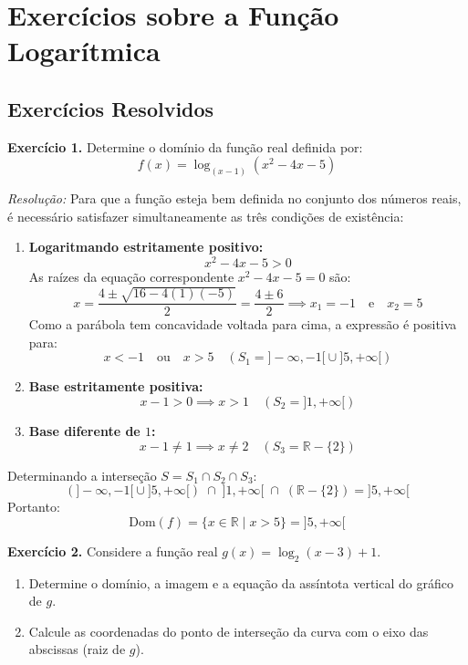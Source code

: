 \documentclass[12pt,a4paper]{report}
\begin{document}
	\section{Exercícios sobre a Função Logarítmica}
	
	\subsection*{Exercícios Resolvidos}
	
	\textbf{Exercício 1.} Determine o domínio da função real definida por:
	$$f(x) = \log_{(x - 1)} (x^2 - 4x - 5)$$
	
	\textit{Resolução:}  
	Para que a função esteja bem definida no conjunto dos números reais, é necessário satisfazer simultaneamente as três condições de existência:
	\begin{enumerate}[label=\textbf{\arabic*.}]
		\item \textbf{Logaritmando estritamente positivo:}
		$$x^2 - 4x - 5 > 0$$
		As raízes da equação correspondente $x^2 - 4x - 5 = 0$ são:
		$$x = \frac{4 \pm \sqrt{16 - 4(1)(-5)}}{2} = \frac{4 \pm 6}{2} \implies x_1 = -1 \quad \text{e} \quad x_2 = 5$$
		Como a parábola tem concavidade voltada para cima, a expressão é positiva para:
		$$x < -1 \quad \text{ou} \quad x > 5 \quad (S_1 = {]-\infty, -1[} \cup {]5, +\infty[})$$
		
		\item \textbf{Base estritamente positiva:}
		$$x - 1 > 0 \implies x > 1 \quad (S_2 = {]1, +\infty[})$$
		
		\item \textbf{Base diferente de $1$:}
		$$x - 1 \neq 1 \implies x \neq 2 \quad (S_3 = \mathbb{R} - \{2\})$$
	\end{enumerate}
	
	Determinando a interseção $S = S_1 \cap S_2 \cap S_3$:
	$$({]-\infty, -1[} \cup {]5, +\infty[}) \;\cap\; {]1, +\infty[} \;\cap\; (\mathbb{R} - \{2\}) = {]5, +\infty[}$$
	Portanto:
	$$\text{Dom}(f) = \{x \in \mathbb{R} \mid x > 5\} = {]5, +\infty[}$$
	
	\vspace{0.3cm}
	
	\textbf{Exercício 2.}  
	Considere a função real $g(x) = \log_2 (x - 3) + 1$.
	\begin{enumerate}[label=\textbf{\alph*)}]
		\item Determine o domínio, a imagem e a equação da assíntota vertical do gráfico de $g$.
		\item Calcule as coordenadas do ponto de interseção da curva com o eixo das abscissas (raiz de $g$).
	\end{enumerate}
	
\end{document}
